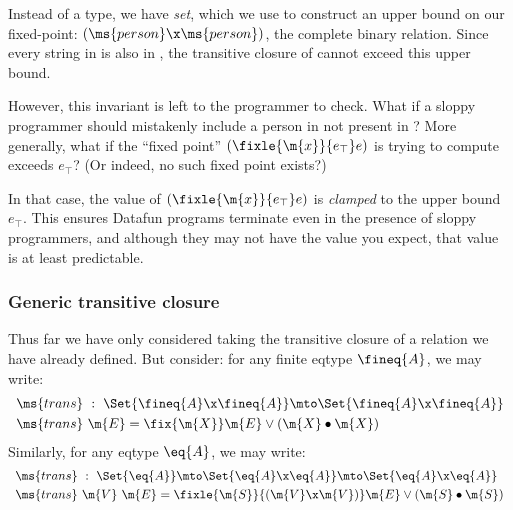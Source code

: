 Instead of a  type, we have  \emph{set}, which we use to
construct an upper bound on our fixed-point: $(\ms{person} \x \ms{person})$, the
complete binary relation. Since every string in  is also in
, the transitive closure of  cannot exceed this upper
bound.

However, this invariant is left to the programmer to check. What if a sloppy
programmer should mistakenly include a person in  not present in
? More generally, what if the ``fixed point'' $(\fixle{\m{x}}{e_\top}
e)$ is trying to compute exceeds $e_\top$? (Or indeed, no such fixed point
exists?)

In that case, the value of $(\fixle{\m{x}}{e_\top} e)$ is \emph{clamped} to the
upper bound $e_\top$. This ensures Datafun programs terminate even in the
presence of sloppy programmers, and although they may not have the value you
expect, that value is at least predictable.


\subsubsection{Generic transitive closure}

Thus far we have only considered taking the transitive closure of a relation we
have already defined. But consider: for any finite eqtype $\fineq{A}$, we may
write:
\[\begin{array}{l}
\ms{trans} ~:~ \Set{\fineq{A} \x \fineq{A}} \mto \Set{\fineq{A} \x \fineq{A}}
\vspace{0.3em}\\
\ms{trans}\ \m{E} = \fix{\m{X}} \m{E} \vee (\m{X} \bullet \m{X})
\end{array}\]
Similarly, for any eqtype $\eq{A}$, we may write:
\[\begin{array}{l}
\ms{trans} ~:~
\Set{\eq{A}} \mto \Set{\eq{A} \x \eq{A}} \mto \Set{\eq{A} \x \eq{A}}
\vspace{0.3em}\\
\ms{trans}\ \m{V}\ \m{E} = %
\fixle{\m{S}}{(\m{V} \x \m{V})} \m{E} \vee (\m{S} \bullet \m{S})
\end{array}\]

